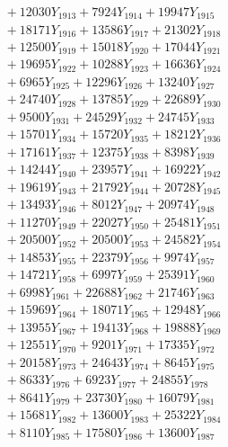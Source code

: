 \documentclass[a4paper,10pt]{article}
\begin{document}
{\begin{align}
&\;  + 12030 Y_{1913} + 7924 Y_{1914} + 19947 Y_{1915} \\[0.3ex]
&\;  + 18171 Y_{1916} + 13586 Y_{1917} + 21302 Y_{1918} \\[0.5ex]\allowbreak
&\;  + 12500 Y_{1919} + 15018 Y_{1920} + 17044 Y_{1921} \\[0.3ex]
&\;  + 19695 Y_{1922} + 10288 Y_{1923} + 16636 Y_{1924} \\[0.3ex]
&\;  + 6965 Y_{1925} + 12296 Y_{1926} + 13240 Y_{1927} \\[0.3ex]
&\;  + 24740 Y_{1928} + 13785 Y_{1929} + 22689 Y_{1930} \\[0.3ex]
&\;  + 9500 Y_{1931} + 24529 Y_{1932} + 24745 Y_{1933} \\[0.3ex]
&\;  + 15701 Y_{1934} + 15720 Y_{1935} + 18212 Y_{1936} \\[0.3ex]
&\;  + 17161 Y_{1937} + 12375 Y_{1938} + 8398 Y_{1939} \\[0.3ex]
&\;  + 14244 Y_{1940} + 23957 Y_{1941} + 16922 Y_{1942} \\[0.3ex]
&\;  + 19619 Y_{1943} + 21792 Y_{1944} + 20728 Y_{1945} \\[0.3ex]
&\;  + 13493 Y_{1946} + 8012 Y_{1947} + 20974 Y_{1948} \\[0.5ex]\allowbreak
&\;  + 11270 Y_{1949} + 22027 Y_{1950} + 25481 Y_{1951} \\[0.3ex]
&\;  + 20500 Y_{1952} + 20500 Y_{1953} + 24582 Y_{1954} \\[0.3ex]
&\;  + 14853 Y_{1955} + 22379 Y_{1956} + 9974 Y_{1957} \\[0.3ex]
&\;  + 14721 Y_{1958} + 6997 Y_{1959} + 25391 Y_{1960} \\[0.3ex]
&\;  + 6998 Y_{1961} + 22688 Y_{1962} + 21746 Y_{1963} \\[0.3ex]
&\;  + 15969 Y_{1964} + 18071 Y_{1965} + 12948 Y_{1966} \\[0.3ex]
&\;  + 13955 Y_{1967} + 19413 Y_{1968} + 19888 Y_{1969} \\[0.3ex]
&\;  + 12551 Y_{1970} + 9201 Y_{1971} + 17335 Y_{1972} \\[0.3ex]
&\;  + 20158 Y_{1973} + 24643 Y_{1974} + 8645 Y_{1975} \\[0.3ex]
&\;  + 8633 Y_{1976} + 6923 Y_{1977} + 24855 Y_{1978} \\[0.5ex]\allowbreak
&\;  + 8641 Y_{1979} + 23730 Y_{1980} + 16079 Y_{1981} \\[0.3ex]
&\;  + 15681 Y_{1982} + 13600 Y_{1983} + 25322 Y_{1984} \\[0.3ex]
&\;  + 8110 Y_{1985} + 17580 Y_{1986} + 13600 Y_{1987} \\[0.3ex]

\end{align}}
\end{document}
